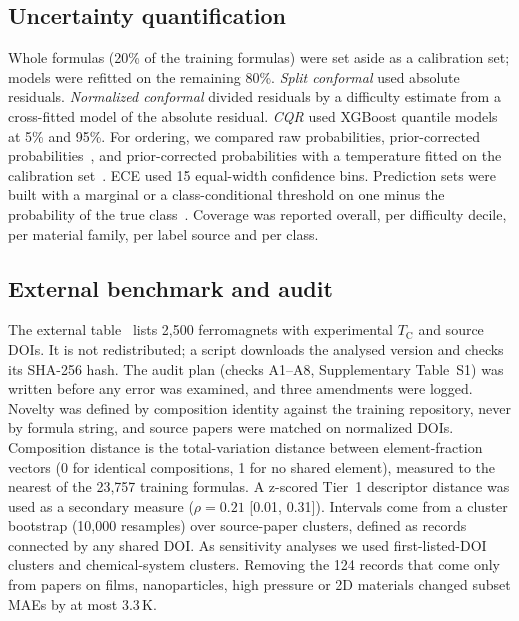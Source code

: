 \documentclass[pdflatex,sn-nature]{sn-jnl}
\newcommand{\Tc}{\ensuremath{T_\mathrm{C}}}
\begin{document}
\subsection{Uncertainty quantification}
Whole formulas (20\% of the training formulas) were set aside as a calibration set; models were refitted on the remaining 80\%. \emph{Split conformal} used absolute residuals. \emph{Normalized conformal} divided residuals by a difficulty estimate from a cross-fitted model of the absolute residual. \emph{CQR} used XGBoost quantile models at 5\% and 95\%. For ordering, we compared raw probabilities, prior-corrected probabilities~\cite{saerens2002adjusting}, and prior-corrected probabilities with a temperature fitted on the calibration set~\cite{guo2017calibration}. ECE used 15 equal-width confidence bins. Prediction sets were built with a marginal or a class-conditional threshold on one minus the probability of the true class~\cite{vovk2013conditional}. Coverage was reported overall, per difficulty decile, per material family, per label source and per class.

\subsection{External benchmark and audit}
The external table~\cite{malaei_magnetic_data,abediorang2026curie} lists 2,500 ferromagnets with experimental \Tc{} and source DOIs. It is not redistributed; a script downloads the analysed version and checks its SHA-256 hash. The audit plan (checks A1--A8, Supplementary Table~S1) was written before any error was examined, and three amendments were logged. Novelty was defined by composition identity against the training repository, never by formula string, and source papers were matched on normalized DOIs. Composition distance is the total-variation distance between element-fraction vectors (0 for identical compositions, 1 for no shared element), measured to the nearest of the 23,757 training formulas. A z-scored Tier~1 descriptor distance was used as a secondary measure ($\rho=0.21$ [0.01, 0.31]). Intervals come from a cluster bootstrap (10,000 resamples) over source-paper clusters, defined as records connected by any shared DOI. As sensitivity analyses we used first-listed-DOI clusters and chemical-system clusters. Removing the 124 records that come only from papers on films, nanoparticles, high pressure or 2D materials changed subset MAEs by at most 3.3\,K.
\end{document}
